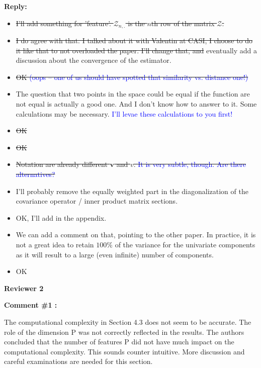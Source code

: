 \documentclass[11pt]{article}
\begin{document}
\medskip

\normalfont

\textbf{Reply:}

\begin{itemize}
  \item \sout{I'll add something for 'feature'. $\mathcal{Z}_{n,.}$ is the $n$th row of the matrix $\mathcal{Z}$.}
  \item \sout{I do agree with that. I talked about it with Valentin at CASI, I choose to do it like that to not overloaded the paper. I'll change that, and} eventually add a discussion about the convergence of the estimator.
  \item \sout{OK \textcolor{blue}{(oops – one of us should have spotted that similarity vs. distance one!)}}
  \item The question that two points in the space could be equal if the function are not equal is actually a good one. And I don't know how to answer to it. Some calculations may be necessary. \textcolor{blue}{I’ll levae these calculations to you first!}
  \item \sout{OK}
  \item \sout{OK}
  \item \sout{Notation are already different $\boldsymbol{v}$ and $v$. \textcolor{blue}{It is very subtle, though. Are there alternatives?}}
  \item I'll probably remove the equally weighted part in the diagonalization of the covariance operator / inner product matrix sections.
  \item OK, I'll add in the appendix.
  \item We can add a comment on that, pointing to the other paper. In practice, it is not a great idea to retain $100\%$ of the variance for the univariate components as it will result to a large (even infinite) number of components. 
  \item OK  
\end{itemize}

\vspace*{1cm}


{\large \textbf{Reviewer 2} }


\bigskip

\itshape


\textbf{Comment \#1 :}

The computational complexity in Section 4.3 does not seem to be accurate. The role of the dimension P was not correctly reflected in the results. The authors concluded that the number of features P did not have much impact on the computational complexity. This sounds counter intuitive. More discussion and careful examinations are needed for this section.
\end{document}
